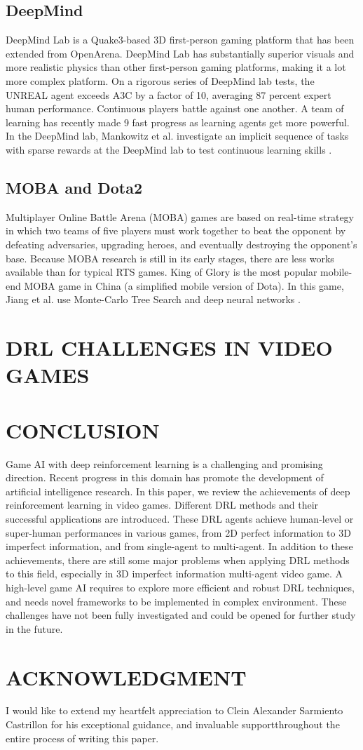 \documentclass{article}
\begin{document}
\subsection{DeepMind}
DeepMind Lab is a Quake3-based 3D first-person gaming
platform that has been extended from OpenArena. DeepMind
Lab has substantially superior visuals and more realistic
physics than other first-person gaming platforms, making it a lot more complex platform. On a rigorous series of DeepMind lab tests, the UNREAL agent exceeds A3C by a factor of 10, averaging 87 percent expert human performance. Continuous players battle against one another. A team of learning has recently made 9 fast progress as learning agents get more powerful. In the DeepMind lab, Mankowitz et al. investigate an implicit sequence of tasks with sparse rewards at the DeepMind lab to test continuous learning skills \cite{mankowitz2018unicorn}. 
\subsection{MOBA and Dota2}
Multiplayer Online Battle Arena (MOBA) games are based on
real-time strategy in which two teams of five players must work together to beat the opponent by defeating adversaries, upgrading heroes, and eventually destroying the opponent's base. Because MOBA research is still in its early stages, there are less works available than for typical RTS games. King of Glory is the most popular mobile-end MOBA game in China (a simplified mobile version of Dota). In this game, Jiang et al. use Monte-Carlo Tree Search and deep neural networks \cite{jiang2018feedback}. 


\section{DRL CHALLENGES IN VIDEO GAMES}
\section{CONCLUSION}
Game AI with deep reinforcement learning is a challenging
and promising direction. Recent progress in this domain has promote the development of artificial intelligence research. In this paper, we review the achievements of deep reinforcement learning in video games. Different DRL methods and their successful applications are introduced. These DRL agents achieve human-level or super-human performances in various games, from 2D perfect information to 3D imperfect information, and from single-agent to multi-agent. In addition to these achievements, there are still some major problems when
applying DRL methods to this field, especially in 3D imperfect information multi-agent video game. A high-level game AI requires to explore more efficient and robust DRL techniques, and needs novel frameworks to be implemented in complex environment. These challenges have not been fully investigated and could be opened for further study in the future.

\section*{ACKNOWLEDGMENT}
I would like to extend my heartfelt appreciation to Clein Alexander Sarmiento Castrillon for his exceptional guidance, and invaluable supportthroughout the entire process of writing this paper.

\newpage


\end{document}
